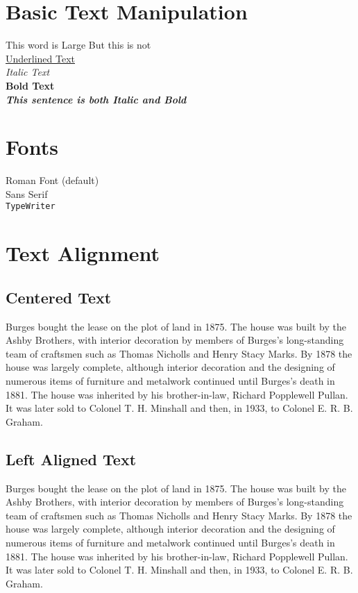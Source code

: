 \documentclass[10pt]{article}
\begin{document}

\section{Basic Text Manipulation}
This word is {\Large Large}
But this is not\\
\underline{Underlined Text}\\
\textit{Italic Text}\\
\textbf{Bold Text}\\
\textbf{{\textit{This sentence is both Italic and Bold  }}}
\section{Fonts}
\textrm{Roman Font (default)}\\
\textsf{Sans Serif}\\
\texttt{TypeWriter}\\


\section{Text Alignment}
\subsection{Centered Text}
\begin{center}
Burges bought the lease on the plot of land in 1875. The house was built by the Ashby Brothers, with interior decoration by members of Burges's long-standing team of craftsmen such as Thomas Nicholls and Henry Stacy Marks. By 1878 the house was largely complete, although interior decoration and the designing of numerous items of furniture and metalwork continued until Burges's death in 1881. The house was inherited by his brother-in-law, Richard Popplewell Pullan. It was later sold to Colonel T. H. Minshall and then, in 1933, to Colonel E. R. B. Graham.
\end{center}

\subsection{Left Aligned Text}
\begin{flushleft}
Burges bought the lease on the plot of land in 1875. The house was built by the Ashby Brothers, with interior decoration by members of Burges's long-standing team of craftsmen such as Thomas Nicholls and Henry Stacy Marks. By 1878 the house was largely complete, although interior decoration and the designing of numerous items of furniture and metalwork continued until Burges's death in 1881. The house was inherited by his brother-in-law, Richard Popplewell Pullan. It was later sold to Colonel T. H. Minshall and then, in 1933, to Colonel E. R. B. Graham.
\end{flushleft}
\end{document}
